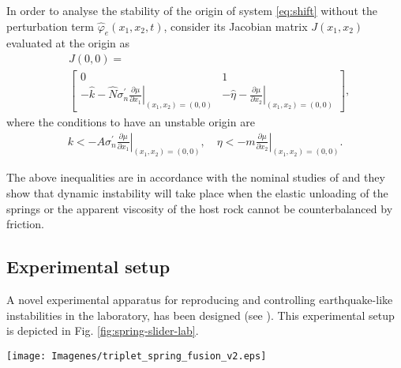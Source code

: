 \documentclass[journal,twoside,web]{ieeecolor}
\newcommand{\Subsin}[1]{\left. #1 \right|}
\begin{document}
In order to analyse the stability of the origin of system \eqref{eq:shift} without the perturbation term $\hat{\varphi}_e(x_1,x_2,t)$, consider its Jacobian matrix $J(x_1,x_2)$ evaluated at the origin as
{\small
\begin{equation*}
\begin{split}
  &J(0,0) = \\
  &\left[\begin{array}{cc}
  0 & 1 \\ 
  -\hat{k}-\hat{N}\sigma_n^\prime \Subsin{\frac{\partial \mu}{\partial x_1}}_{(x_1,x_2)=(0,0)} & -\hat{\eta}-\Subsin{\frac{\partial \mu}{\partial x_2}}_{(x_1,x_2)=(0,0)}
  \end{array} \right],
\end{split}
\end{equation*}}
where the conditions to have an unstable origin are
\begin{equation}
\begin{split}
k < -A\sigma_n^\prime \Subsin{\frac{\partial \mu}{\partial x_1}}_{(x_1,x_2)=(0,0)}, \quad
\eta < -m \Subsin{\frac{\partial \mu}{\partial x_2}}_{(x_1,x_2)=(0,0)}.
\end{split}
\label{eq:inst_cond}
\end{equation}

The above inequalities are in accordance with the nominal studies of \cite{b:Stefanou2019,b:Scholz-2002,b:Dieterich1979} and they show that dynamic instability will take place when the elastic unloading of the springs or the apparent viscosity of the host rock cannot be counterbalanced by friction. %

\subsection{Experimental setup}

A novel experimental apparatus for reproducing and controlling earthquake-like instabilities in the laboratory, has been designed (see \cite{b:Tzortzopoulos-2021,b:https://doi.org/10.1029/2021JB023410,b:Stefanou-Tzortzopoulos-Braun-Patent}). This experimental setup is depicted in Fig. \ref{fig:spring-slider-lab}.

\begin{figure*}[ht!]
  \centering 
  \texttt{[image: Imagenes/triplet\_spring\_fusion\_v2.eps]}
  \caption{Experimental apparatus for reproducing and controlling earthquake-like instabilities: (a)Schematic figure, (b)Real configuration}
  \label{fig:spring-slider-lab}
\end{figure*}
\end{document}
